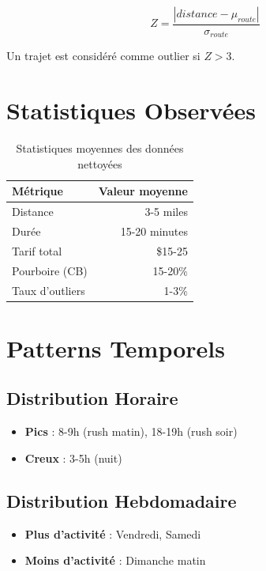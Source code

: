 \documentclass[12pt,a4paper]{report}
\begin{document}
\begin{equation}
Z = \frac{|distance - \mu_{route}|}{\sigma_{route}}
\end{equation}

Un trajet est considéré comme outlier si $Z > 3$.

\section{Statistiques Observées}

\begin{table}[H]
\centering
\caption{Statistiques moyennes des données nettoyées}
\begin{tabular}{@{}lr@{}}
\toprule
\textbf{Métrique} & \textbf{Valeur moyenne} \\
\midrule
Distance & 3-5 miles \\
Durée & 15-20 minutes \\
Tarif total & \$15-25 \\
Pourboire (CB) & 15-20\% \\
Taux d'outliers & 1-3\% \\
\bottomrule
\end{tabular}
\end{table}

\section{Patterns Temporels}

\subsection{Distribution Horaire}

\begin{itemize}
    \item \textbf{Pics} : 8-9h (rush matin), 18-19h (rush soir)
    \item \textbf{Creux} : 3-5h (nuit)
\end{itemize}

\subsection{Distribution Hebdomadaire}

\begin{itemize}
    \item \textbf{Plus d'activité} : Vendredi, Samedi
    \item \textbf{Moins d'activité} : Dimanche matin
\end{itemize}
\end{document}

